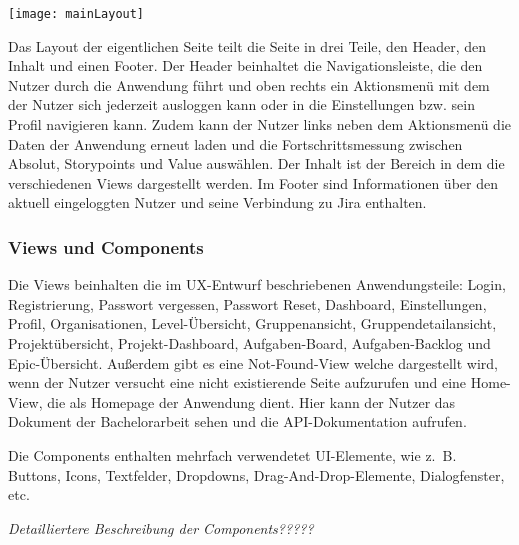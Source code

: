 \vspace{20pt}
\begin{center}
    \begin{minipage}{0.8\linewidth}
        \texttt{[image: mainLayout]}
    \end{minipage}
\end{center}
\vspace{20pt}

Das Layout der eigentlichen Seite teilt die Seite in drei Teile, den Header, den Inhalt und einen Footer. Der Header beinhaltet die Navigationsleiste, die den Nutzer durch die Anwendung führt und oben rechts ein Aktionsmenü mit dem der Nutzer sich jederzeit ausloggen kann oder in die Einstellungen bzw. sein Profil navigieren kann. Zudem kann der Nutzer links neben dem Aktionsmenü die Daten der Anwendung erneut laden und die Fortschrittsmessung zwischen Absolut, Storypoints und Value auswählen. Der Inhalt ist der Bereich in dem die verschiedenen Views dargestellt werden. Im Footer sind Informationen über den aktuell eingeloggten Nutzer und seine Verbindung zu Jira enthalten.

\subsubsection{Views und Components}
Die Views beinhalten die im UX-Entwurf beschriebenen Anwendungsteile: Login, Registrierung, Passwort vergessen, Passwort Reset, Dashboard, Einstellungen, Profil, Organisationen, Level-Übersicht, Gruppenansicht, Gruppendetailansicht, Projektübersicht, Projekt-Dashboard, Aufgaben-Board, Aufgaben-Backlog und Epic-Übersicht. Außerdem gibt es eine Not-Found-View welche dargestellt wird, wenn der Nutzer versucht eine nicht existierende Seite aufzurufen und eine Home-View, die als Homepage der Anwendung dient. Hier kann der Nutzer das Dokument der Bachelorarbeit sehen und die API-Dokumentation aufrufen.

Die Components enthalten mehrfach verwendetet UI-Elemente, wie z. B. Buttons, Icons, Textfelder, Dropdowns, Drag-And-Drop-Elemente, Dialogfenster, etc.

\emph{Detailliertere Beschreibung der Components?????}

